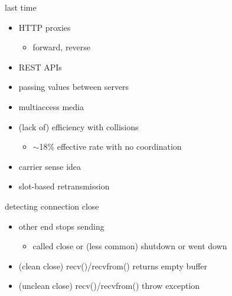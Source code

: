 \date{}
\title{}
\date{}
\usepackage{pgfplots}
\pgfplotsset{compat=1.14}

\begin{frame}
    \titlepage
\end{frame}

\begin{frame}{last time}
    \begin{itemize}
    \item HTTP proxies
        \begin{itemize}
        \item forward, reverse
        \end{itemize}
    \item REST APIs
    \item passing values between servers
    \item multiaccess media
    \item (lack of) efficiency with collisions
        \begin{itemize}
        \item $\sim$18\% effective rate with no coordination
        \end{itemize}
    \item carrier sense idea
    \item slot-based retransmission
    \end{itemize}
\end{frame}

\begin{frame}{detecting connection close}
    \begin{itemize}
    \item other end stops sending
        \begin{itemize}
        \item called close or (less common) shutdown or went down
        \end{itemize}
    \item (clean close) recv()/recvfrom() returns empty buffer
    \item (unclean close) recv()/recvfrom() throw exception
    \end{itemize}
\end{frame}

